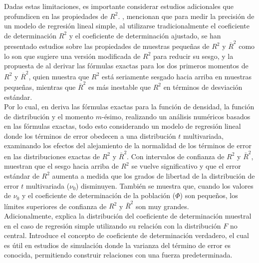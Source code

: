 Dadas estas limitaciones, es importante considerar estudios adicionales que profundicen en las propiedades de $R^{2}$. \textcite{Ohtani-2004}, mencionan que para medir la precisión de un modelo de regresión lineal simple, al utilizarse tradicionalmente el coeficiente de determinación  \( R^2 \) y el coeficiente de determinación ajustado, se han presentado estudios sobre las propiedades de muestras pequeñas de \( R^2 \) y \( \overline{R}^2 \) como lo son \textcite{barten-1962} que sugiere una versión modificada de \( R^2 \) para reducir su sesgo, y la propuesta de \textcite{crammer-1987} al derivar las fórmulas exactas para los dos primeros momentos de \( R^2 \) y \( \overline{R}^2 \), quien muestra que \( R^2 \) está seriamente sesgado hacia arriba en muestras pequeñas, mientras que \( \overline{R}^2 \) es más inestable que \( R^2 \) en términos de desviación estándar.\\


Por lo cual, en \textcite{Ohtani-2004} deriva las fórmulas exactas para la función de densidad, la función de distribución y el momento \(m\)-ésimo, realizando un análisis numéricos basados en las fórmulas exactas, todo esto considerando un modelo de regresión lineal donde los términos de error obedecen a una distribución \(t\) multivariada, examinando los efectos del alejamiento de la normalidad de los términos de error en las distribuciones exactas de \(R^2\) y \(\bar{R}^2\). Con intervalos de confianza de \(R^2\) y \(\bar{R}^2\), muestran que el sesgo hacia arriba de \(R^2\) se vuelve significativo y que el error estándar de \(R^2\) aumenta a medida que los grados de libertad de la distribución de error \(t\) multivariada (\(\nu_0\)) disminuyen. También se muestra que, cuando los valores de \(\nu_0\) y el coeficiente de determinación de la población (\(\Phi\)) son pequeños, los límites superiores de confianza de \(R^2\) y \(\bar{R}^2\) son muy grandes.\\

Adicionalmente, \textcite{christou-2005} explica la distribución del coeficiente de determinación muestral en el caso de regresión simple utilizando su relación con la distribución \(F\) no central. Introduce el concepto de coeficiente de determinación verdadero, el cual es útil en estudios de simulación donde la varianza del término de error es conocida, permitiendo construir relaciones con una fuerza predeterminada.\\







